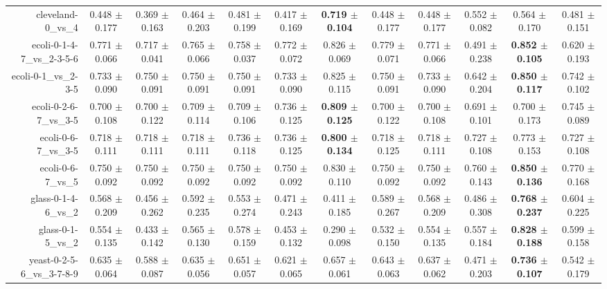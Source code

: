 \begin{table}[!ht]
{\begin{tabular}{r c c c c c c c c c c c}
cleveland-0\_vs\_4 & 0.448 $\pm$ 0.177 & 0.369 $\pm$ 0.163 & 0.464 $\pm$ 0.203 & 0.481 $\pm$ 0.199 & 0.417 $\pm$ 0.169 & \textbf{0.719 $\pm$ 0.104} & 0.448 $\pm$ 0.177 & 0.448 $\pm$ 0.177 & 0.552 $\pm$ 0.082 & 0.564 $\pm$ 0.170 & 0.481 $\pm$ 0.151 \\
ecoli-0-1-4-7\_vs\_2-3-5-6 & 0.771 $\pm$ 0.066 & 0.717 $\pm$ 0.041 & 0.765 $\pm$ 0.066 & 0.758 $\pm$ 0.037 & 0.772 $\pm$ 0.072 & 0.826 $\pm$ 0.069 & 0.779 $\pm$ 0.071 & 0.771 $\pm$ 0.066 & 0.491 $\pm$ 0.238 & \textbf{0.852 $\pm$ 0.105} & 0.620 $\pm$ 0.193 \\
ecoli-0-1\_vs\_2-3-5 & 0.733 $\pm$ 0.090 & 0.750 $\pm$ 0.091 & 0.750 $\pm$ 0.091 & 0.750 $\pm$ 0.091 & 0.733 $\pm$ 0.090 & 0.825 $\pm$ 0.115 & 0.750 $\pm$ 0.091 & 0.733 $\pm$ 0.090 & 0.642 $\pm$ 0.204 & \textbf{0.850 $\pm$ 0.117} & 0.742 $\pm$ 0.102 \\
ecoli-0-2-6-7\_vs\_3-5 & 0.700 $\pm$ 0.108 & 0.700 $\pm$ 0.122 & 0.709 $\pm$ 0.114 & 0.709 $\pm$ 0.106 & 0.736 $\pm$ 0.125 & \textbf{0.809 $\pm$ 0.125} & 0.700 $\pm$ 0.122 & 0.700 $\pm$ 0.108 & 0.691 $\pm$ 0.101 & 0.700 $\pm$ 0.173 & 0.745 $\pm$ 0.089 \\
ecoli-0-6-7\_vs\_3-5 & 0.718 $\pm$ 0.111 & 0.718 $\pm$ 0.111 & 0.718 $\pm$ 0.111 & 0.736 $\pm$ 0.118 & 0.736 $\pm$ 0.125 & \textbf{0.800 $\pm$ 0.134} & 0.718 $\pm$ 0.125 & 0.718 $\pm$ 0.111 & 0.727 $\pm$ 0.108 & 0.773 $\pm$ 0.153 & 0.727 $\pm$ 0.108 \\
ecoli-0-6-7\_vs\_5 & 0.750 $\pm$ 0.092 & 0.750 $\pm$ 0.092 & 0.750 $\pm$ 0.092 & 0.750 $\pm$ 0.092 & 0.750 $\pm$ 0.092 & 0.830 $\pm$ 0.110 & 0.750 $\pm$ 0.092 & 0.750 $\pm$ 0.092 & 0.760 $\pm$ 0.143 & \textbf{0.850 $\pm$ 0.136} & 0.770 $\pm$ 0.168 \\
glass-0-1-4-6\_vs\_2 & 0.568 $\pm$ 0.209 & 0.456 $\pm$ 0.262 & 0.592 $\pm$ 0.235 & 0.553 $\pm$ 0.274 & 0.471 $\pm$ 0.243 & 0.411 $\pm$ 0.185 & 0.589 $\pm$ 0.267 & 0.568 $\pm$ 0.209 & 0.486 $\pm$ 0.308 & \textbf{0.768 $\pm$ 0.237} & 0.604 $\pm$ 0.225 \\
glass-0-1-5\_vs\_2 & 0.554 $\pm$ 0.135 & 0.433 $\pm$ 0.142 & 0.565 $\pm$ 0.130 & 0.578 $\pm$ 0.159 & 0.453 $\pm$ 0.132 & 0.290 $\pm$ 0.098 & 0.532 $\pm$ 0.150 & 0.554 $\pm$ 0.135 & 0.557 $\pm$ 0.184 & \textbf{0.828 $\pm$ 0.188} & 0.599 $\pm$ 0.158 \\
yeast-0-2-5-6\_vs\_3-7-8-9 & 0.635 $\pm$ 0.064 & 0.588 $\pm$ 0.087 & 0.635 $\pm$ 0.056 & 0.651 $\pm$ 0.057 & 0.621 $\pm$ 0.065 & 0.657 $\pm$ 0.061 & 0.643 $\pm$ 0.063 & 0.637 $\pm$ 0.062 & 0.471 $\pm$ 0.203 & \textbf{0.736 $\pm$ 0.107} & 0.542 $\pm$ 0.179 \\

\end{tabular}}
\end{table}
